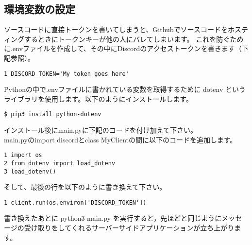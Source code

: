 \subsection{環境変数の設定}
ソースコードに直接トークンを書いてしまうと、Githubでソースコードをホスティングするときにトークンキーが他の人にバレてしまいます。
これを防ぐために.envファイルを作成して、その中にDiscordのアクセストークンを書きます（下記参照）。
\begin{tcolorbox}[breakable]
  \begin{verbatim}
1 DISCORD_TOKEN='My token goes here'
\end{verbatim}
\end{tcolorbox}
Pythonの中で.envファイルに書かれている変数を取得するために dotenv というライブラリを使用します。以下のようにインストールします。
\begin{shaded}
  \begin{verbatim}
$ pip3 install python-dotenv
\end{verbatim}
\end{shaded}
インストール後にmain.pyに下記のコードを付け加えて下さい。\\
main.pyのimport discordとclass MyClientの間に以下のコードを追加します。
\begin{tcolorbox}[breakable]
  \begin{verbatim}
1 import os
2 from dotenv import load_dotenv
3 load_dotenv()
\end{verbatim}
\end{tcolorbox}
そして、最後の行を以下のように書き換えて下さい。
\begin{tcolorbox}[breakable]
  \begin{verbatim}
1 client.run(os.environ['DISCORD_TOKEN'])
\end{verbatim}
\end{tcolorbox}
書き換えたあとに python3 main.py を実行すると，先ほどと同じようにメッセージの受け取りをしてくれるサーバーサイドアプリケーションが立ち上がります。

